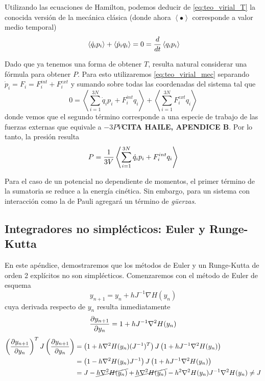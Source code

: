 Utilizando las ecuaciones de Hamilton, podemos deducir de \eqref{eq:teo_virial_T} la conocida versión de la mecánica clásica
(donde ahora $\left< \bullet \right>$ corresponde a valor medio temporal)
\begin{equation}{\label{eq:teo_virial_mec}}
  \left< \dot{q}_ip_i \right> + \left< \dot{p}_iq_i \right> = 0 = \frac{d}{dt}\left< q_ip_i \right>
\end{equation}

Dado que ya tenemos una forma de obtener $T$, resulta natural considerar una fórmula para obtener $P$.
Para esto utilizaremos \ref{eq:teo_virial_mec} separando $\dot{p}_i = F_i = F_i^{int}+F_i^{ext}$ y sumando sobre todas las coordenadas del sistema tal que
\[ 0 = \left< \sum_{i=1}^{3N} \dot{q}_ip_i + F_i^{int}q_i \right> + \left< \sum_{i=1}^{3N}F_i^{ext}q_i \right>  \]
donde vemos que el segundo término corresponde a una especie de trabajo de las fuerzas externas que equivale a $-3PV$\textbf{CITA HAILE, APENDICE B}.
Por lo tanto, la presión resulta
\begin{equation}{\label{eq:teo_virial_P}}
P = \frac{1}{3V}\left< \sum_{i=1}^{3N} \dot{q}_ip_i + F_i^{int}q_i \right>
\end{equation}

Para el caso de un potencial no dependiente de momentos, el primer término de la sumatoria se reduce a la energía cinética.
Sin embargo, para un sistema con interacción como la de Pauli agregará un término de \textit{g\"uerzas}.


\subsection{Integradores no simplécticos: Euler y Runge-Kutta}{\label{sec:no_simp}}

En este apéndice, demostraremos que los métodos de Euler y un Runge-Kutta de orden 2 explícitos no son simplécticos.
Comenzaremos con el método de Euler de esquema
\[ y_{n+1} = y_n + h J^{-1} \nabla H(y_n) \]
cuya derivada respecto de $y_n$ resulta inmediatamente
\[ \frac{\partial y_{n+1}}{\partial y_n} = 1 + hJ^{-1}\nabla^2H (y_n)\]
\begin{align*}
 \left( \frac{\partial y_{n+1}}{\partial y_n} \right)^T J \left( \frac{\partial y_{n+1}}{\partial y_n} \right) &= \left(1 + h\nabla^2 H(y_n)(J^{-1})^T\right) J \left(1 + hJ^{-1}\nabla^2 H(y_n)\right) \\
 &= \left(1 - h\nabla^2 H(y_n)J^{-1}\right) J \left(1 + hJ^{-1}\nabla^2 H(y_n)\right) \\
 &= J - \cancel{h\nabla^2 H(y_n)} + \cancel{h\nabla^2 H(y_n)} - h^2\nabla^2 H(y_n)J^{-1}\nabla^2 H(y_n) \neq J
\end{align*}


